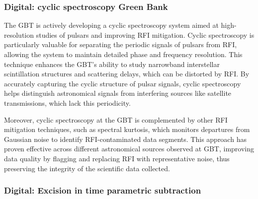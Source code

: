 
\subsubsection{Digital: cyclic spectroscopy Green Bank}

The GBT is actively developing a cyclic spectroscopy system aimed at high-resolution studies of pulsars and improving RFI mitigation. Cyclic spectroscopy is particularly valuable for separating the periodic signals of pulsars from RFI, allowing the system to maintain detailed phase and frequency resolution. This technique enhances the GBT’s ability to study narrowband interstellar scintillation structures and scattering delays, which can be distorted by RFI. By accurately capturing the cyclic structure of pulsar signals, cyclic spectroscopy helps distinguish astronomical signals from interfering sources like satellite transmissions, which lack this periodicity.

Moreover, cyclic spectroscopy at the GBT is complemented by other RFI mitigation techniques, such as spectral kurtosis, which monitors departures from Gaussian noise to identify RFI-contaminated data segments. This approach has proven effective across different astronomical sources observed at GBT, improving data quality by flagging and replacing RFI with representative noise, thus preserving the integrity of the scientific data collected.

\subsubsection{Digital: Excision in time parametric subtraction}

